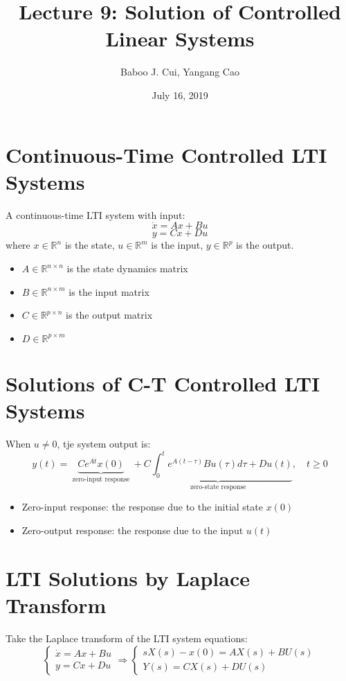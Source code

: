 \documentclass[10pt,a4paper,oneside]{article}
\date{July 16, 2019}
\author{Baboo J. Cui, Yangang Cao}
\title{Lecture 9: Solution of Controlled Linear Systems}
\begin{document}
\maketitle
\tableofcontents
\newpage
\section{Continuous-Time Controlled LTI Systems}
A continuous-time LTI system with input:
\[
\dot{x} = Ax+Bu
\]
\[
y=Cx+Du
\]
where $x\in\mathbb{R}^n$ is the state, $u\in\mathbb{R}^m$ is the input, $y\in\mathbb{R}^p$ is the output.
\begin{itemize}
\item $A\in\mathbb{R}^{n\times n}$ is the state dynamics matrix
\item $B\in\mathbb{R}^{n\times m}$ is the input matrix
\item $C\in\mathbb{R}^{p\times n}$ is the output matrix
\item $D\in\mathbb{R}^{p\times m}$
\end{itemize}
\section{Solutions of C-T Controlled LTI Systems}
When $u\neq0$, tje system output is:
\[
y(t)=\underbrace{C e^{A t} x(0)}_{\text { zero-input response }}+\underbrace{C \int_{0}^{t} e^{A(t-\tau)} B u(\tau) d \tau+D u(t)}_{\text { zero-state response }}, \quad t \geq 0
\]
\begin{itemize}
\item Zero-input response: the response due to the initial state $x(0)$
\item Zero-output response: the response due to the input $u(t)$
\end{itemize}
\section{LTI Solutions by Laplace Transform}
Take the Laplace transform of the LTI system equations:
\[
\left\{\begin{array}{l}{\dot{x}=A x+B u} \\ {y=C x+D u}\end{array} \Rightarrow\left\{\begin{array}{l}{s X(s)-x(0)=AX(s)+BU(s)} \\ {Y(s)=CX(s)+DU(s)}\end{array}\right.\right.
\]
\end{document}

